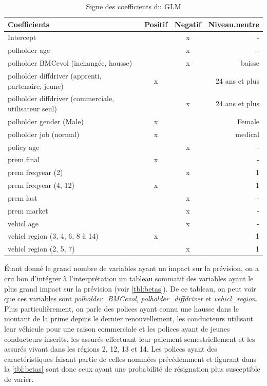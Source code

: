\documentclass[]{article}
\begin{document}
\begin{table}[ht]
\centering
\caption{Signe des coefficients du GLM} 
\label{tbl:glm_coeff}
\begin{tabular}{lccr}
  \hline
Coefficients & Positif & Negatif & Niveau.neutre \\ 
  \hline
Intercept &  & x & - \\ 
  polholder age &  & x & - \\ 
  polholder BMCevol (inchangée, hausse) &  & x & baisse \\ 
  polholder diffdriver (apprenti, partenaire, jeune) & x &  & 24 ans et plus \\ 
  polholder diffdriver (commerciale, utilisateur seul) &  & x & 24 ans et plus \\ 
  polholder gender (Male) & x &  & Female \\ 
  polholder job (normal) & x &  & medical \\ 
  policy age &  & x & - \\ 
  prem final & x &  & - \\ 
  prem freqyear (2) &  & x & 1 \\ 
  prem freqyear (4, 12) & x &  & 1 \\ 
  prem last &  & x & - \\ 
  prem market &  & x & - \\ 
  vehicl age &  & x & - \\ 
  vehicl region (3, 4, 6, 8 à 14) & x &  & 1 \\ 
  vehicl region (2, 5, 7) &  & x & 1 \\ 
   \hline
\end{tabular}
\end{table}

Étant donné le grand nombre de variables ayant un impact sur la
prévision, on a cru bon d'intégrer à l'interprétation un tableau
sommatif des variables ayant le plus grand impact sur la prévision (voir
\autoref{tbl:betas}). De ce tableau, on peut voir que ces variables sont
\emph{polholder\_BMCevol}, \emph{polholder\_diffdriver} et
\emph{vehicl\_region}. Plus particulièrement, on parle des polices ayant
connu une hausse dans le montant de la prime depuis le dernier
renouvellement, les conducteurs utilisant leur véhicule pour une raison
commerciale et les polices ayant de jeunes conducteurs inscrits, les
assurés effectuant leur paiement semestriellement et les assurés vivant
dans les régions 2, 12, 13 et 14. Les polices ayant des caractéristiques
faisant partie de celles nommées précédemment et figurant dans la
\autoref{tbl:betas} sont donc ceux ayant une probabilité de résignation
plus susceptible de varier.
\end{document}
